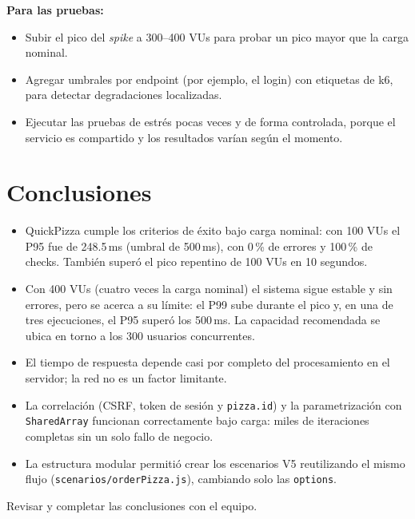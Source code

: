 \documentclass[11pt]{article}
\begin{document}
\textbf{Para las pruebas:}
\begin{itemize}
  \item Subir el pico del \emph{spike} a 300--400 VUs para probar un pico mayor que
        la carga nominal.
  \item Agregar umbrales por endpoint (por ejemplo, el login) con etiquetas de k6,
        para detectar degradaciones localizadas.
  \item Ejecutar las pruebas de estrés pocas veces y de forma controlada, porque el
        servicio es compartido y los resultados varían según el momento.
\end{itemize}

\section{Conclusiones}

\begin{itemize}
  \item QuickPizza cumple los criterios de éxito bajo carga nominal: con 100 VUs el
        P95 fue de 248.5\,ms (umbral de 500\,ms), con 0\,\% de errores y 100\,\% de
        checks. También superó el pico repentino de 100 VUs en 10 segundos.
  \item Con 400 VUs (cuatro veces la carga nominal) el sistema sigue estable y sin
        errores, pero se acerca a su límite: el P99 sube durante el pico y, en una de
        tres ejecuciones, el P95 superó los 500\,ms. La capacidad recomendada se ubica
        en torno a los 300 usuarios concurrentes.
  \item El tiempo de respuesta depende casi por completo del procesamiento en el
        servidor; la red no es un factor limitante.
  \item La correlación (CSRF, token de sesión y \texttt{pizza.id}) y la
        parametrización con \texttt{SharedArray} funcionan correctamente bajo carga:
        miles de iteraciones completas sin un solo fallo de negocio.
  \item La estructura modular permitió crear los escenarios V5 reutilizando el mismo
        flujo (\texttt{scenarios/\allowbreak orderPizza.js}), cambiando solo las \texttt{options}.
\end{itemize}

\begin{pendiente}Revisar y completar las conclusiones con el equipo.\end{pendiente}
\end{document}

